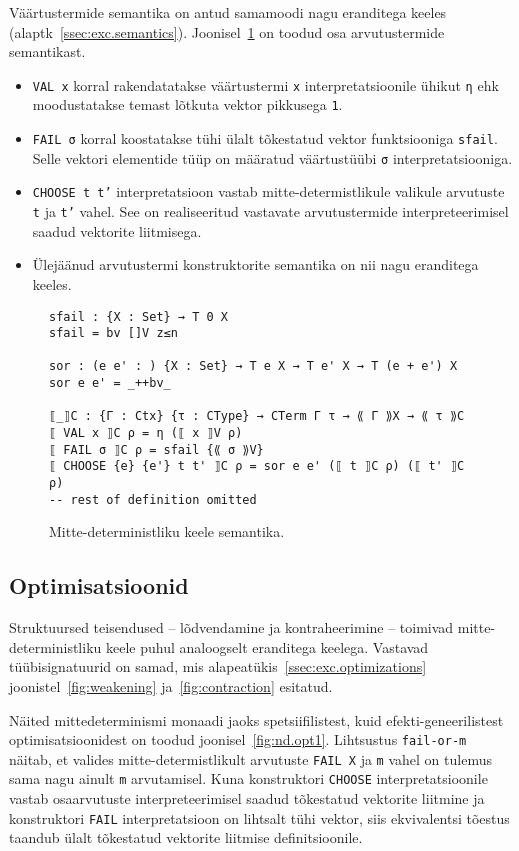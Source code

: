 \documentclass[a4paper,12pt]{article}
\begin{document}
Väärtustermide semantika on antud samamoodi nagu eranditega keeles (alaptk~\ref{ssec:exc.semantics}).
Joonisel~\ref{fig:nd.semantics} on toodud osa arvutustermide semantikast.
\begin{itemize}
\item {\tt VAL x} korral rakendatatakse väärtustermi {\tt x} interpretatsioonile ühikut {\tt η} ehk moodustatakse temast lõtkuta vektor pikkusega {\tt 1}.
\item {\tt FAIL σ} korral koostatakse tühi ülalt tõkestatud vektor funktsiooniga {\tt sfail}. Selle vektori elementide tüüp on määratud väärtustüübi {\tt σ} interpretatsiooniga.
\item {\tt CHOOSE t t'} interpretatsioon vastab mitte-determistlikule valikule arvutuste {\tt t} ja {\tt t'} vahel. See on realiseeritud vastavate arvutustermide interpreteerimisel saadud vektorite liitmisega.
\item Ülejäänud arvutustermi konstruktorite semantika on nii nagu eranditega keeles.
\end{itemize}
\begin{figure}
  \begin{BVerbatim}
sfail : {X : Set} → T 0 X
sfail = bv []V z≤n

sor : (e e' : ) {X : Set} → T e X → T e' X → T (e + e') X
sor e e' = _++bv_

⟦_⟧C : {Γ : Ctx} {τ : CType} → CTerm Γ τ → ⟪ Γ ⟫X → ⟪ τ ⟫C
⟦ VAL x ⟧C ρ = η (⟦ x ⟧V ρ)
⟦ FAIL σ ⟧C ρ = sfail {⟪ σ ⟫V}
⟦ CHOOSE {e} {e'} t t' ⟧C ρ = sor e e' (⟦ t ⟧C ρ) (⟦ t' ⟧C ρ)
-- rest of definition omitted
  \end{BVerbatim}
  \caption{Mitte-deterministliku keele semantika.}
  \label{fig:nd.semantics}
\end{figure}

\subsection{Optimisatsioonid}

Struktuursed teisendused -- lõdvendamine ja kontraheerimine -- toimivad mitte-deterministliku keele puhul analoogselt eranditega keelega. Vastavad tüübisignatuurid on samad, mis alapeatükis~\ref{ssec:exc.optimizations} joonistel~\ref{fig:weakening} ja~\ref{fig:contraction} esitatud.

Näited mittedeterminismi monaadi jaoks spetsiifilistest, kuid efekti-geneerilistest optimisatsioonidest on toodud joonisel~\ref{fig:nd.opt1}.
Lihtsustus {\tt fail-or-m} näitab, et valides mitte-determistlikult arvutuste {\tt FAIL X} ja {\tt m} vahel on tulemus sama nagu ainult {\tt m} arvutamisel. Kuna konstruktori {\tt CHOOSE} interpretatsioonile vastab osaarvutuste interpreteerimisel saadud tõkestatud vektorite liitmine ja konstruktori {\tt FAIL} interpretatsioon on lihtsalt tühi vektor, siis ekvivalentsi tõestus taandub ülalt tõkestatud vektorite liitmise definitsioonile.
\end{document}
